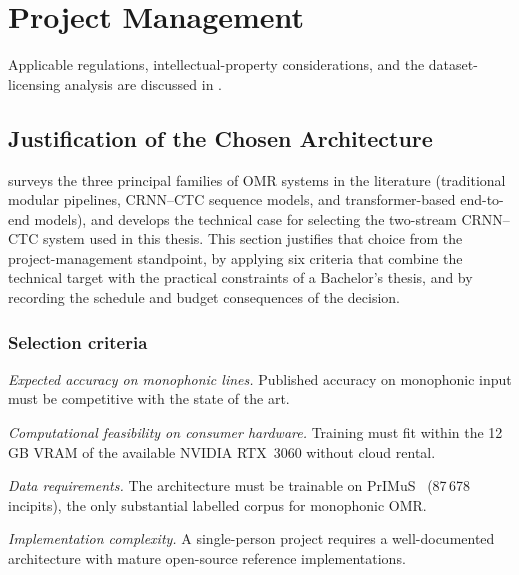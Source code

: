 \chapter{Project Management}
\label{ch:mgmt}

Applicable regulations, intellectual-property considerations, and the
dataset-licensing analysis are discussed in .


\section{Justification of the Chosen Architecture}
\label{sec:mgmt-justification}

 surveys the three principal families of OMR
systems in the literature (traditional modular pipelines,
CRNN--CTC sequence models, and transformer-based end-to-end
models), and  develops the technical case for
selecting the two-stream CRNN--CTC system used in this thesis.
This section justifies that choice from the project-management
standpoint, by applying six criteria that combine the technical
target with the practical constraints of a Bachelor's thesis,
and by recording the schedule and budget consequences of the
decision.

\subsection{Selection criteria}

\textit{Expected accuracy on monophonic lines.}
Published accuracy on monophonic input must be competitive with the state of the art.

\textit{Computational feasibility on consumer hardware.}
Training must fit within the 12\,GB VRAM of the available NVIDIA RTX~3060 without cloud rental.

\textit{Data requirements.}
The architecture must be trainable on PrIMuS~\cite{PrIMuSDataset} (87\,678 incipits), the only substantial labelled corpus for monophonic OMR.

\textit{Implementation complexity.}
A single-person project requires a well-documented architecture with mature open-source reference implementations.

